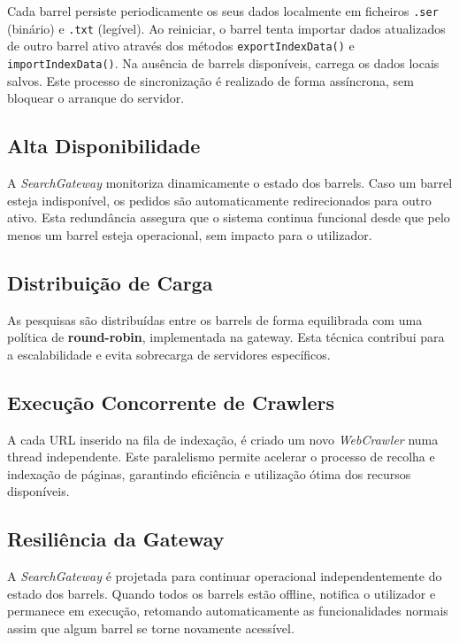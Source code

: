 \documentclass{article}
\begin{document}
Cada barrel persiste periodicamente os seus dados localmente em ficheiros \texttt{.ser} (binário) e \texttt{.txt} (legível). Ao reiniciar, o barrel tenta importar dados atualizados de outro barrel ativo através dos métodos \texttt{exportIndexData()} e \texttt{importIndexData()}. Na ausência de barrels disponíveis, carrega os dados locais salvos. Este processo de sincronização é realizado de forma assíncrona, sem bloquear o arranque do servidor.

\subsection{Alta Disponibilidade}

A \textit{SearchGateway} monitoriza dinamicamente o estado dos barrels. Caso um barrel esteja indisponível, os pedidos são automaticamente redirecionados para outro ativo. Esta redundância assegura que o sistema continua funcional desde que pelo menos um barrel esteja operacional, sem impacto para o utilizador.

\subsection{Distribuição de Carga}

As pesquisas são distribuídas entre os barrels de forma equilibrada com uma política de \textbf{round-robin}, implementada na gateway. Esta técnica contribui para a escalabilidade e evita sobrecarga de servidores específicos.

\subsection{Execução Concorrente de Crawlers}

A cada URL inserido na fila de indexação, é criado um novo \textit{WebCrawler} numa thread independente. Este paralelismo permite acelerar o processo de recolha e indexação de páginas, garantindo eficiência e utilização ótima dos recursos disponíveis.

\subsection{Resiliência da Gateway}

A \textit{SearchGateway} é projetada para continuar operacional independentemente do estado dos barrels. Quando todos os barrels estão offline, notifica o utilizador e permanece em execução, retomando automaticamente as funcionalidades normais assim que algum barrel se torne novamente acessível.
\end{document}
